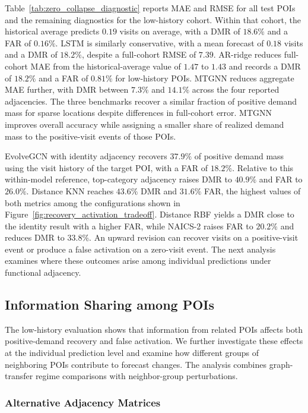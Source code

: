 \documentclass[preprint,authoryear,11pt]{elsarticle}
\theoremstyle{definition}
\begin{document}
Table~\ref{tab:zero_collapse_diagnostic} reports MAE and RMSE for all test POIs and the remaining diagnostics for the low-history cohort.
Within that cohort, the historical average predicts \(0.19\) visits on average, with a DMR of \(18.6\%\) and a FAR of \(0.16\%\).
LSTM is similarly conservative, with a mean forecast of \(0.18\) visits and a DMR of \(18.2\%\), despite a full-cohort RMSE of \(7.39\).
AR-ridge reduces full-cohort MAE from the historical-average value of \(1.47\) to \(1.43\) and records a DMR of \(18.2\%\) and a FAR of \(0.81\%\) for low-history POIs.
MTGNN reduces aggregate MAE further, with DMR between \(7.3\%\) and \(14.1\%\) across the four reported adjacencies.
The three benchmarks recover a similar fraction of positive demand mass for sparse locations despite differences in full-cohort error.
MTGNN improves overall accuracy while assigning a smaller share of realized demand mass to the positive-visit events of those POIs.

EvolveGCN with identity adjacency recovers \(37.9\%\) of positive demand mass using the visit history of the target POI, with a FAR of \(18.2\%\).
Relative to this within-model reference, top-category adjacency raises DMR to \(40.9\%\) and FAR to \(26.0\%\).
Distance KNN reaches \(43.6\%\) DMR and \(31.6\%\) FAR, the highest values of both metrics among the configurations shown in Figure~\ref{fig:recovery_activation_tradeoff}.
Distance RBF yields a DMR close to the identity result with a higher FAR, while NAICS-2 raises FAR to \(20.2\%\) and reduces DMR to \(33.8\%\).
An upward revision can recover visits on a positive-visit event or produce a false activation on a zero-visit event.
The next analysis examines where these outcomes arise among individual predictions under functional adjacency.

\subsection{Information Sharing among POIs}
\label{subsec:information_sharing_results}


The low-history evaluation shows that information from related POIs affects both positive-demand recovery and false activation.
We further investigate these effects at the individual prediction level and examine how different groups of neighboring POIs contribute to forecast changes.
The analysis combines graph-transfer regime comparisons with neighbor-group perturbations.


\subsubsection{Alternative Adjacency Matrices}
\label{subsubsec:adjacency_results}
\end{document}
